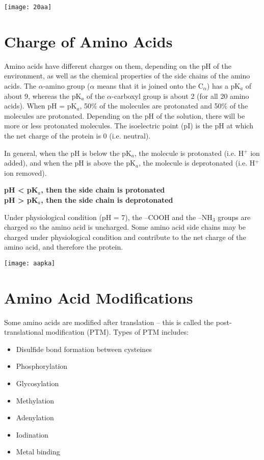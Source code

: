 \documentclass[a4paper, 12pt]{report}
\begin{document}
\texttt{[image: 20aa]}

\section{Charge of Amino Acids}

Amino acids have different charges on them, depending on the pH of the environment, as well as the chemical properties of the side chains of the amino acids.
The $\alpha$-amino group ($\alpha$ means that it is joined onto the C$_{\alpha}$) has a pK$_a$ of about 9, whereas the pK$_a$ of the $\alpha$-carboxyl group is about 2 (for all 20 amino acids).
When pH = pK$_a$, 50\% of the molecules are protonated and 50\% of the molecules are protonated.
Depending on the pH of the solution, there will be more or less protonated molecules.
The isoelectric point (pI) is the pH at which the net charge of the protein is 0 (i.e. neutral).

In general, when the pH is below the pK$_a$, the molecule is protonated (i.e. H$^+$ ion added), and when the pH is above the pK$_a$, the molecule is deprotonated (i.e. H$^+$ ion removed).

\begin{center}
    \textbf
        {pH \textless{} pK$_a$, then the side chain is protonated \\
        pH \textgreater{} pK$_a$, then the side chain is deprotonated}
\end{center}

Under physiological condition (pH = 7), the --COOH and the --NH$_3$ groups are charged so the amino acid is uncharged.
Some amino acid side chains may be charged under physiological condition and contribute to the net charge of the amino acid, and therefore the protein.

\begin{center}
\texttt{[image: aapka]}
\end{center}

\section{Amino Acid Modifications}

Some amino acids are modified after translation -- this is called the post-translational modification (PTM).
Types of PTM includes:
\begin{itemize}
    \item Disulfide bond formation between cysteines
    \item Phosphorylation
    \item Glycosylation
    \item Methylation
    \item Adenylation
    \item Iodination
    \item Metal binding
\end{itemize}
\end{document}
